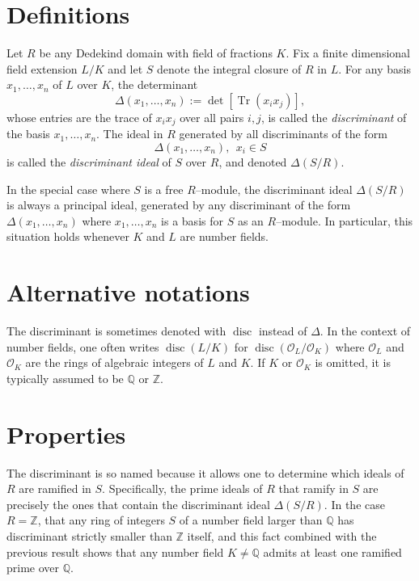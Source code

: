 \documentclass[12pt]{article}
\newcommand{\Tr}{\operatorname{Tr}}
\begin{document}
\section{Definitions}

Let $R$ be any Dedekind domain with field of fractions $K$. Fix a finite dimensional field extension $L/K$ and let $S$ denote the integral closure of $R$ in $L$. For any basis $x_1, \ldots, x_n$ of $L$ over $K$, the determinant
$$
\Delta(x_1,\ldots,x_n) := \det[\Tr(x_i x_j)],
$$
whose entries are the trace of $x_i x_j$ over all pairs $i,j$, is called the {\em discriminant} of the basis $x_1,\ldots,x_n$. The ideal in $R$ generated by all discriminants of the form
$$
\Delta(x_1,\ldots,x_n),\ \ x_i \in S
$$
is called the {\em discriminant ideal} of $S$ over $R$, and denoted $\Delta(S/R)$.

In the special case where $S$ is a free $R$--module, the discriminant ideal $\Delta(S/R)$ is always a principal ideal, generated by any discriminant of the form $\Delta(x_1,\ldots,x_n)$ where $x_1,\ldots,x_n$ is a basis for $S$ as an $R$--module. In particular, this situation holds whenever $K$ and $L$ are number fields.

\section{Alternative notations}

The discriminant is sometimes denoted with $\operatorname{disc}$ instead of $\Delta$. In the context of number fields, one often writes $\operatorname{disc}(L/K)$ for $\operatorname{disc}(\mathcal{O}_L/\mathcal{O}_K)$ where $\mathcal{O}_L$ and $\mathcal{O}_K$ are the rings of algebraic integers of $L$ and $K$. If $K$ or $\mathcal{O}_K$ is omitted, it is typically assumed to be $\mathbb{Q}$ or $\mathbb{Z}$.

\section{Properties}

The discriminant is so named because it allows one to determine which ideals of $R$ are ramified in $S$. Specifically, the prime ideals of $R$ that ramify in $S$ are precisely the ones that contain the discriminant ideal $\Delta(S/R)$. In the case $R = \mathbb{Z}$,   that any ring of integers $S$ of a number field larger than $\mathbb{Q}$ has discriminant strictly smaller than $\mathbb{Z}$ itself, and this fact combined with the previous result shows that any number field $K \neq \mathbb{Q}$ admits at least one ramified prime over $\mathbb{Q}$.
\end{document}
